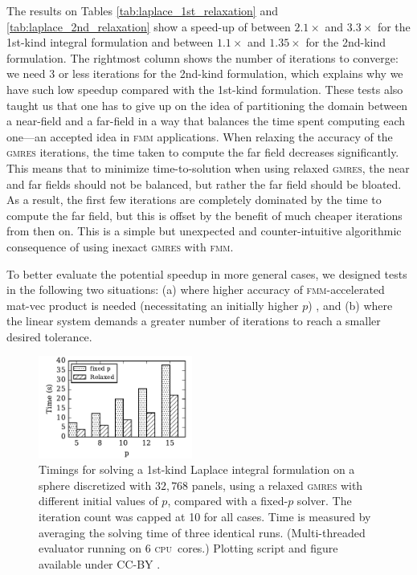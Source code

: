 \documentclass[final,3p,times]{elsarticle}
\newcommand{\cpu}{\textsc{cpu}}
\newcommand{\fmm}{\textsc{fmm}\xspace}
\newcommand{\gmres}{\textsc{gmres}\xspace}
\begin{document}
The results on Tables \ref{tab:laplace_1st_relaxation} and \ref{tab:laplace_2nd_relaxation} show a speed-up of between $2.1\times$ and $3.3\times$ for the 1st-kind integral formulation and between $1.1\times$ and $1.35\times$ for the 2nd-kind formulation. 
The rightmost column shows the number of iterations to converge: we need 3 or less iterations for the 2nd-kind formulation, which explains why we have such low speedup compared with the 1st-kind formulation.
These tests also taught us that one has to give up on the idea of partitioning the domain between a near-field and a far-field in a way that balances the time spent computing each one---an accepted idea in \fmm applications. When relaxing the accuracy of the \gmres iterations, the time taken to compute the far field decreases significantly. This means that to minimize time-to-solution when using relaxed \gmres, the near and far fields should not be balanced, but rather the far field should be bloated. As a result, the first few iterations are completely dominated by the time to compute the far field, but this is offset by the benefit of much cheaper iterations from then on. This is a simple but unexpected and counter-intuitive algorithmic consequence of using inexact \gmres with \fmm.

To better evaluate the potential speedup in more general cases, we designed tests in the following two situations: (a) where higher accuracy of \fmm-accelerated mat-vec product is needed (necessitating an initially higher $p$) , and (b) where the linear system demands a greater number of iterations to reach a smaller desired tolerance. 

\begin{figure}%
	\centering
	\includegraphics[natwidth=3in,natheight=2in,width=0.45\textwidth]{LaplaceRelaxationP.pdf}
	\caption{Timings for solving a 1st-kind Laplace integral formulation on a sphere discretized with $32,768$ panels, using a relaxed \gmres with different initial values of $p$, compared with a fixed-$p$ solver. The iteration count was capped at 10 for all cases. Time is measured by averaging the solving time of three identical runs. (Multi-threaded evaluator running on 6 \cpu\ cores.) Plotting script and figure available under CC-BY \cite{WangLaytonBarba2016-figshare2}.}
	\label{fig:laplace_p_speedup}
\end{figure}
\end{document}
